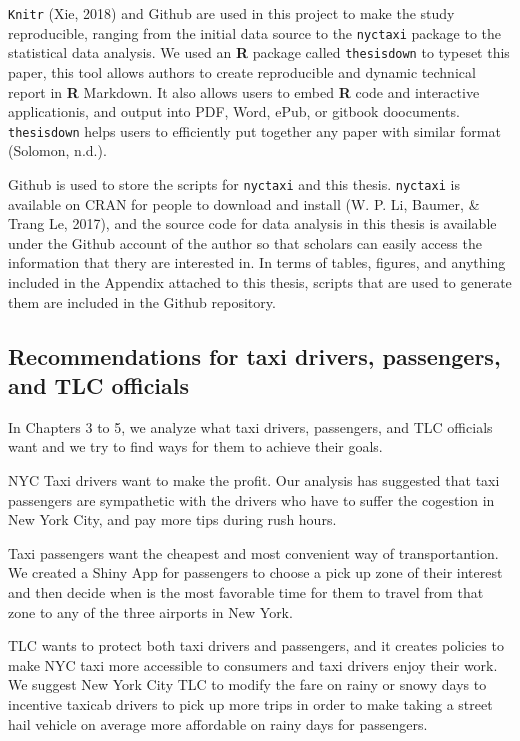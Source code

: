 \documentclass[12pt,twoside]{reedthesis}
\theoremstyle{definition}
\theoremstyle{definition}
\theoremstyle{definition}
\theoremstyle{remark}
\begin{document}
\texttt{Knitr} (Xie, 2018) and Github are used in this project to make
the study reproducible, ranging from the initial data source to the
\texttt{nyctaxi} package to the statistical data analysis. We used an
\textbf{R} package called \texttt{thesisdown} to typeset this paper,
this tool allows authors to create reproducible and dynamic technical
report in \textbf{R} Markdown. It also allows users to embed \textbf{R}
code and interactive applicationis, and output into PDF, Word, ePub, or
gitbook doocuments. \texttt{thesisdown} helps users to efficiently put
together any paper with similar format (Solomon, n.d.).

Github is used to store the scripts for \texttt{nyctaxi} and this
thesis. \texttt{nyctaxi} is available on CRAN for people to download and
install (W. P. Li, Baumer, \& Trang Le, 2017), and the source code for
data analysis in this thesis is available under the Github account of
the author so that scholars can easily access the information that thery
are interested in. In terms of tables, figures, and anything included in
the Appendix attached to this thesis, scripts that are used to generate
them are included in the Github repository.

\subsection{Recommendations for taxi drivers, passengers, and TLC
officials}\label{recommendations-for-taxi-drivers-passengers-and-tlc-officials}

In Chapters 3 to 5, we analyze what taxi drivers, passengers, and TLC
officials want and we try to find ways for them to achieve their goals.

NYC Taxi drivers want to make the profit. Our analysis has suggested
that taxi passengers are sympathetic with the drivers who have to suffer
the cogestion in New York City, and pay more tips during rush hours.

Taxi passengers want the cheapest and most convenient way of
transportantion. We created a Shiny App for passengers to choose a pick
up zone of their interest and then decide when is the most favorable
time for them to travel from that zone to any of the three airports in
New York.

TLC wants to protect both taxi drivers and passengers, and it creates
policies to make NYC taxi more accessible to consumers and taxi drivers
enjoy their work. We suggest New York City TLC to modify the fare on
rainy or snowy days to incentive taxicab drivers to pick up more trips
in order to make taking a street hail vehicle on average more affordable
on rainy days for passengers.
\end{document}
